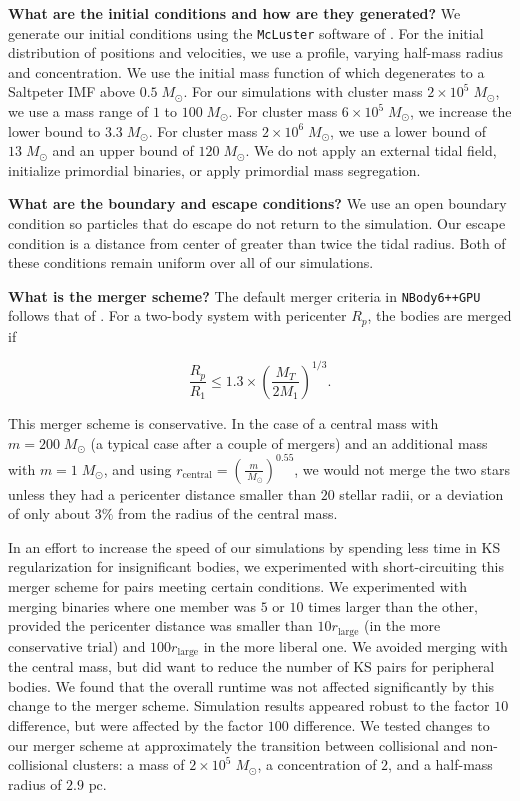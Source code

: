 \documentclass[preprint1]{aastex}
\newcommand\Msun{\; M_\odot}
\newcommand\pc{\mbox{ pc}}
\newcommand\nbody{\texttt{NBody6++GPU }}
\numberwithin{equation}{section}
\begin{document}
\textbf{What are the initial conditions and how are they generated?}
We generate our initial conditions using the \texttt{McLuster} software of \citet{2011Kupper}. For the initial distribution of positions and velocities, we use a \citet{1966King} profile, varying half-mass radius and concentration.  We use the initial mass function of \citet{2001Kroupa} which degenerates to a Saltpeter IMF above $0.5 \Msun$.  For our simulations with cluster mass $2 \times 10^5 \Msun$, we use a mass range of $1$ to $100 \Msun$.  For cluster mass $6 \times 10^5 \Msun$, we increase the lower bound to $3.3 \Msun$.  For cluster mass $2 \times 10^6 \Msun$, we use a lower bound of $13 \Msun$ and an upper bound of $120 \Msun$.  We do not apply an external tidal field, initialize primordial binaries, or apply primordial mass segregation. 

\textbf{What are the boundary and escape conditions?}
We use an open boundary condition so particles that do escape do not return to the simulation. Our escape condition is a distance from center of greater than twice the tidal radius. Both of these conditions remain uniform over all of our simulations.

\textbf{What is the merger scheme?}
The default merger criteria in \nbody follows that of \citet{1992Kochanek}.  For a two-body system with pericenter $R_p$, the bodies are merged if

\begin{equation}
 \frac{R_{p}}{R_{1}} \leq 1.3 \times (\frac{M_T}{2M_1})^{1/3}.
 \label{eqn:kochanekcriteria}
\end{equation}

This merger scheme is conservative.  In the case of a central mass with $m = 200 \Msun$ (a typical case after a couple of mergers) and an additional mass with $m = 1 \Msun$, and using $r_{\mathrm{central}} = (\frac{m}{\Msun})^{0.55}$, we would not merge the two stars unless they had a pericenter distance smaller than $20$ stellar radii, or a deviation of only about $3\%$ from the radius of the central mass.

In an effort to increase the speed of our simulations by spending less time in KS regularization for insignificant bodies, we experimented with short-circuiting this merger scheme for pairs meeting certain conditions.  We experimented with merging binaries where one member was $5$ or $10$ times larger than the other, provided the pericenter distance was smaller than $10 r_\mathrm{large}$ (in the more conservative trial) and $100 r_\mathrm{large}$ in the more liberal one.  We avoided merging with the central mass, but did want to reduce the number of KS pairs for peripheral bodies. We found that the overall runtime was not affected significantly by this change to the merger scheme. Simulation results appeared robust to the factor $10$ difference, but were affected by the factor $100$ difference.  We tested changes to our merger scheme at approximately the transition between collisional and non-collisional clusters: a mass of $2 \times 10^5 \Msun$, a concentration of $2$, and a half-mass radius of $2.9 \pc$.
\end{document}
